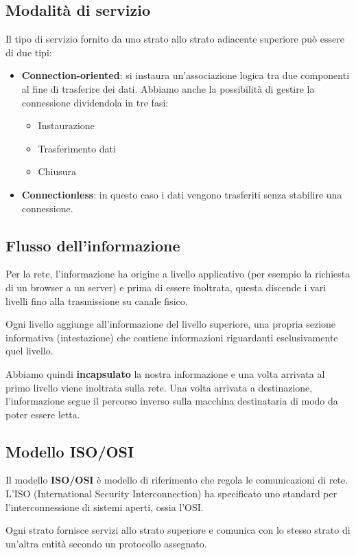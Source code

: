 \subsection{Modalità di servizio}
Il tipo di servizio fornito da uno strato allo strato adiacente 
superiore può essere di due tipi:
\begin{itemize}
	\item \textbf{Connection-oriented}: si instaura un'associazione 
		logica tra due componenti al fine di trasferire dei dati.
		Abbiamo anche la possibilità di gestire la connessione 
		dividendola in tre fasi:
		\begin{itemize}
			\item Instaurazione
			\item Trasferimento dati
			\item Chiusura
		\end{itemize}
	\item \textbf{Connectionless}: in questo caso i dati vengono 
		trasferiti senza stabilire una connessione.
\end{itemize}

\subsection{Flusso dell'informazione}
Per la rete, l'informazione ha origine a livello applicativo (per 
esempio la richiesta di un browser a un server) e prima di essere 
inoltrata, questa discende i vari livelli fino alla trasmissione su 
canale fisico.

Ogni livello aggiunge all'informazione del livello superiore, una 
propria sezione informativa (intestazione) che contiene informazioni 
riguardanti esclusivamente quel livello.

Abbiamo quindi \textbf{incapsulato} la nostra informazione e una volta 
arrivata al primo livello viene inoltrata sulla rete. Una volta 
arrivata a destinazione, l'informazione segue il percorso inverso sulla
macchina destinataria di modo da poter essere letta.

\subsection{Modello ISO/OSI}
Il modello \textbf{ISO/OSI} è modello di riferimento che regola le 
comunicazioni di rete. L'ISO (International Security Interconnection)
ha specificato uno standard per l'interconnessione di sistemi aperti, 
ossia l'OSI.

Ogni strato fornisce servizi allo strato superiore e comunica con lo 
stesso strato di un'altra entità secondo un protocollo assegnato.


